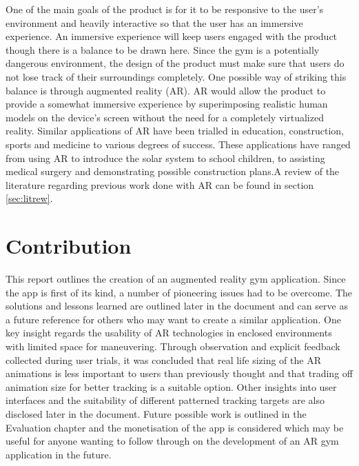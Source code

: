 \documentclass{l4proj}
\begin{document}
One of the main goals of the product is for it to be responsive to the user's environment and heavily interactive so that the user has an immersive experience. An immersive experience will keep users engaged with the product though there is a balance to be drawn here. Since the gym is a potentially dangerous environment, the design of the product must make sure that users do not lose track of their surroundings completely. One possible way of striking this balance is through augmented reality (AR). AR would allow the product to provide a somewhat immersive experience by superimposing realistic human models on the device's screen without the need for a completely virtualized reality. Similar applications of AR have been trialled in education, construction, sports and medicine to various degrees of success. These applications have ranged from using AR to introduce the solar system to school children\cite{kerawalla_making_2006}, to assisting medical surgery\cite{samset_augmented_2008} and demonstrating possible construction plans\cite{azuma_survey_1997}.A review of the literature regarding previous work done with AR can be found in section \ref{sec:litrew}.

\section{Contribution}
This report outlines the creation of an augmented reality gym application. Since the app is first of its kind, a number of pioneering issues had to be overcome. The solutions and lessons learned are outlined later in the document and can serve as a future reference for others who may want to create a similar application. One key insight regards the usability of AR technologies in enclosed environments with limited space for maneuvering. Through observation and explicit feedback collected during user trials, it was concluded that real life sizing of the AR animations is less important to users than previously thought and that trading off animation size for better tracking is a suitable option. Other insights into user interfaces and the suitability of different patterned tracking targets are also disclosed later in the document. Future possible work is outlined in the Evaluation chapter and the monetisation of the app is considered which may be useful for anyone wanting to follow through on the development of an AR gym application in the future.
\end{document}
